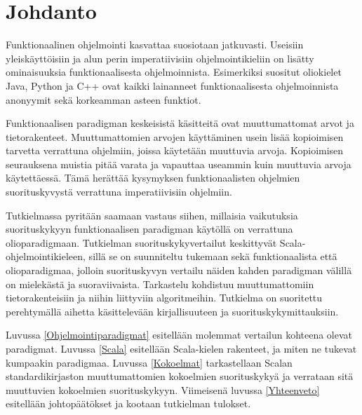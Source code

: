 \chapter{Johdanto} \label{Johdanto}
Funktionaalinen ohjelmointi kasvattaa suosiotaan jatkuvasti. Useisiin yleiskäyttöisiin ja alun perin imperatiivisiin ohjelmointikieliin on lisätty ominaisuuksia funktionaalisesta ohjelmoinnista. Esimerkiksi suositut oliokielet Java, Python ja C++ ovat kaikki lainanneet funktionaalisesta ohjelmoinnista anonyymit sekä korkeamman asteen funktiot.

Funktionaalisen paradigman keskeisistä käsitteitä ovat muuttumattomat arvot ja tietorakenteet. Muuttumattomien arvojen käyttäminen usein lisää kopioimisen tarvetta verrattuna ohjelmiin, joissa käytetään muuttuvia arvoja. Kopioimisen seurauksena muistia pitää varata ja vapauttaa useammin kuin muuttuvia arvoja käytettäessä. Tämä herättää kysymyksen funktionaalisten ohjelmien suorituskyvystä verrattuna imperatiivisiin ohjelmiin.

Tutkielmassa pyritään saamaan vastaus siihen, millaisia vaikutuksia suorituskykyyn funktionaalisen paradigman käytöllä on verrattuna olioparadigmaan. Tutkielman suorituskykyvertailut keskittyvät Scala-ohjelmointikieleen, sillä se on suunniteltu tukemaan sekä funktionaalista että olioparadigmaa, jolloin suorituskyvyn vertailu näiden kahden paradigman välillä on mielekästä ja suoraviivaista. Tarkastelu kohdistuu muuttumattomiin tietorakenteisiin ja niihin liittyviin algoritmeihin. Tutkielma on suoritettu perehtymällä aihetta käsittelevään kirjallisuuteen ja suorituskykymittauksiin.

Luvussa \ref{Ohjelmointiparadigmat} esitellään molemmat vertailun kohteena olevat paradigmat. Luvussa \ref{Scala} esitellään Scala-kielen rakenteet, ja miten ne tukevat kumpaakin paradigmaa. Luvussa \ref{Kokoelmat} tarkastellaan Scalan standardikirjaston muuttumattomien kokoelmien suorituskykyä ja verrataan sitä muuttuvien kokoelmien suorituskykyyn. Viimeisenä luvussa \ref{Yhteenveto} esitellään johtopäätökset ja kootaan tutkielman tulokset.
